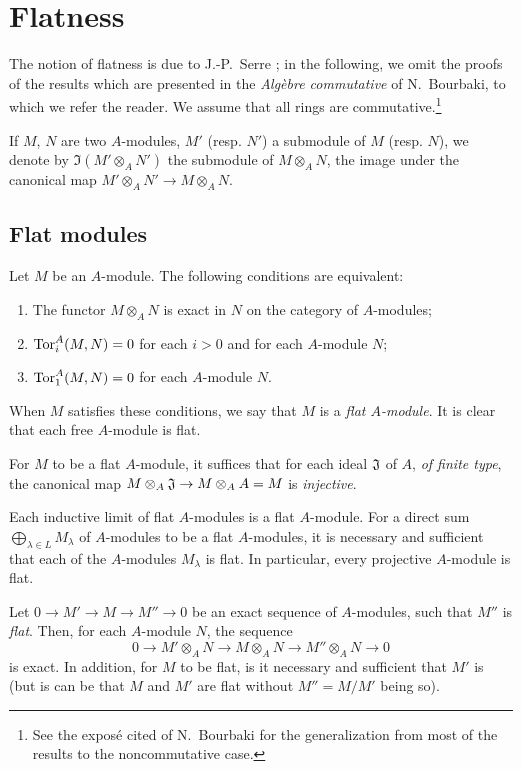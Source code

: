 \section{Flatness}
\label{section-flatness}

\begin{env}[6.0]
\label{0.6.0.0}
The notion of flatness is due to J.-P.~Serre \cite{I-16}; in the following, we omit the
proofs of the results which are presented in the {\em Alg\`ebre commutative} of N.~Bourbaki,
to which we refer the reader. We assume that all rings are commutative.\footnote{See the
expos\'e cited of N.~Bourbaki for the generalization from most of the results to the
noncommutative case.}

If $M$, $N$ are two $A$-modules, $M'$ (resp. $N'$) a submodule of $M$ (resp. $N$), we denote
by $\Im(M'\otimes_A N')$ the submodule of $M\otimes_A N$, the image under the canonical map
$M'\otimes_A N'\to M\otimes_A N$.
\end{env}

\subsection{Flat modules}
\label{subsection-flat-modules}

\begin{env}[6.1.1]
\label{0.6.1.1}
Let $M$ be an $A$-module. The following conditions are equivalent:
\begin{enumerate}[label=(\alph*)]
  \item The functor $M\otimes_A N$ is exact in $N$ on the category of $A$-modules;
  \item ${\mathop{\mathrm{Tor}}\nolimits}_i^A(M,N)=0$ for each $i>0$ and for each $A$-module $N$;
  \item ${\mathop{\mathrm{Tor}}\nolimits}_1^A(M,N)=0$ for each $A$-module $N$.
\end{enumerate}

When $M$ satisfies these conditions, we say that $M$ is a
{\em flat $A$-module}. It is clear that each free $A$-module is flat.

For $M$ to be a flat $A$-module, it suffices that for each ideal $\mathfrak{J}$
of $A$, {\em of finite type}, the canonical map
$M\otimes_A\mathfrak{J}\to M\otimes_A A=M$ is {\em injective}.
\end{env}

\begin{env}[6.1.2]
\label{0.6.1.2}
Each inductive limit of flat $A$-modules is a flat $A$-module. For a direct sum
$\bigoplus_{\lambda\in L}M_\lambda$ of $A$-modules to be a flat $A$-modules, it
is necessary and sufficient that each of the $A$-modules $M_\lambda$ is flat. In
particular, every projective $A$-module is flat.

Let $0\to M'\to M\to M''\to 0$ be an exact sequence of $A$-modules, such that
$M''$ is {\em flat}. Then, for each $A$-module $N$, the sequence
\[
  0\longrightarrow M'\otimes_A N\longrightarrow M\otimes_A N
  \longrightarrow M''\otimes_A N\longrightarrow 0
\]
is exact. In addition, for $M$ to be flat, is it necessary and sufficient that
$M'$ is (but is can be that $M$ and $M'$ are flat without $M''=M/M'$ being so).
\end{env}

